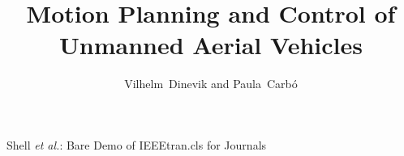 \documentclass[journal]{IEEEtran}
\begin{document}
	\title{Motion Planning and Control of Unmanned Aerial Vehicles}
	\author{Vilhelm~Dinevik and Paula~Carb\'o}
		
	
	
	{Shell \MakeLowercase{\textit{et al.}}: Bare Demo of IEEEtran.cls for Journals}
	
	\maketitle
	
\end{document}

